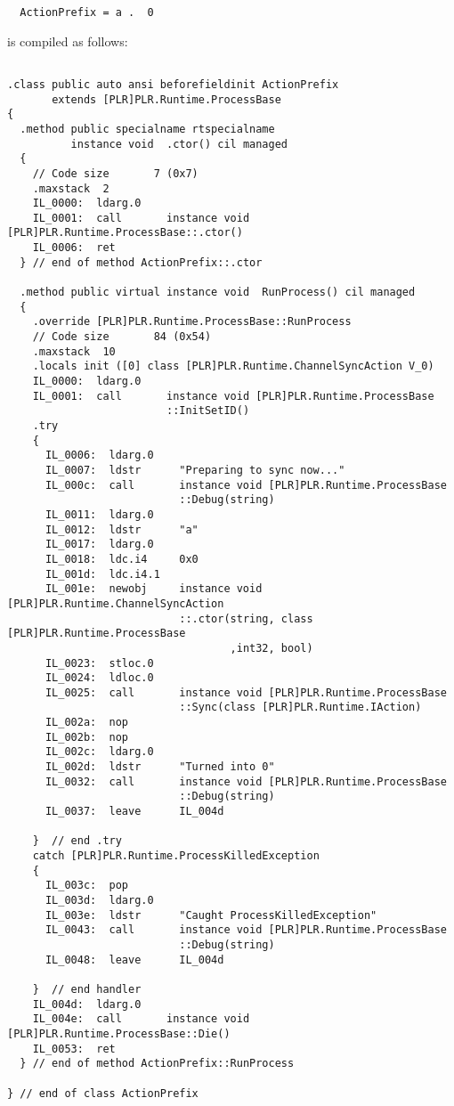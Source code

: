 	\begin{verbatim}
  ActionPrefix = a .  0
	\end{verbatim}
	
	is compiled as follows:
	
	\begin{lstlisting}

.class public auto ansi beforefieldinit ActionPrefix
       extends [PLR]PLR.Runtime.ProcessBase
{
  .method public specialname rtspecialname 
          instance void  .ctor() cil managed
  {
    // Code size       7 (0x7)
    .maxstack  2
    IL_0000:  ldarg.0
    IL_0001:  call       instance void [PLR]PLR.Runtime.ProcessBase::.ctor()
    IL_0006:  ret
  } // end of method ActionPrefix::.ctor

  .method public virtual instance void  RunProcess() cil managed
  {
    .override [PLR]PLR.Runtime.ProcessBase::RunProcess
    // Code size       84 (0x54)
    .maxstack  10
    .locals init ([0] class [PLR]PLR.Runtime.ChannelSyncAction V_0)
    IL_0000:  ldarg.0
    IL_0001:  call       instance void [PLR]PLR.Runtime.ProcessBase
                         ::InitSetID()
    .try
    {
      IL_0006:  ldarg.0
      IL_0007:  ldstr      "Preparing to sync now..."
      IL_000c:  call       instance void [PLR]PLR.Runtime.ProcessBase
                           ::Debug(string)
      IL_0011:  ldarg.0
      IL_0012:  ldstr      "a"
      IL_0017:  ldarg.0
      IL_0018:  ldc.i4     0x0
      IL_001d:  ldc.i4.1
      IL_001e:  newobj     instance void [PLR]PLR.Runtime.ChannelSyncAction
                           ::.ctor(string, class [PLR]PLR.Runtime.ProcessBase
                                   ,int32, bool)
      IL_0023:  stloc.0
      IL_0024:  ldloc.0
      IL_0025:  call       instance void [PLR]PLR.Runtime.ProcessBase
                           ::Sync(class [PLR]PLR.Runtime.IAction)
      IL_002a:  nop
      IL_002b:  nop
      IL_002c:  ldarg.0
      IL_002d:  ldstr      "Turned into 0"
      IL_0032:  call       instance void [PLR]PLR.Runtime.ProcessBase
                           ::Debug(string)
      IL_0037:  leave      IL_004d

    }  // end .try
    catch [PLR]PLR.Runtime.ProcessKilledException 
    {
      IL_003c:  pop
      IL_003d:  ldarg.0
      IL_003e:  ldstr      "Caught ProcessKilledException"
      IL_0043:  call       instance void [PLR]PLR.Runtime.ProcessBase
                           ::Debug(string)
      IL_0048:  leave      IL_004d

    }  // end handler
    IL_004d:  ldarg.0
    IL_004e:  call       instance void [PLR]PLR.Runtime.ProcessBase::Die()
    IL_0053:  ret
  } // end of method ActionPrefix::RunProcess

} // end of class ActionPrefix

\end{lstlisting}

